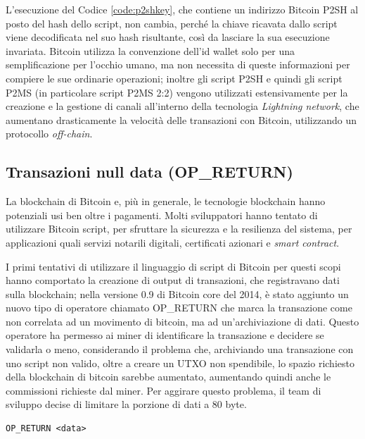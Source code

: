 

L’esecuzione del Codice \ref{code:p2shkey}, che contiene un indirizzo Bitcoin P2SH al posto del hash dello script, non cambia, perché la chiave ricavata dallo script viene decodificata nel suo hash risultante, così da lasciare la sua esecuzione invariata.
Bitcoin utilizza la convenzione dell'id wallet solo per una semplificazione per l'occhio umano, ma non necessita di queste informazioni per compiere le sue ordinarie operazioni; inoltre gli script P2SH e quindi gli script P2MS (in particolare script P2MS 2:2) vengono utilizzati estensivamente per la creazione e la gestione di canali all’interno della tecnologia {\it Lightning network\/}, che aumentano drasticamente la velocità delle transazioni con Bitcoin, utilizzando un protocollo {\it off-chain\/}.

\subsection{Transazioni null data (OP\_RETURN)}\label{sub:sectionNUllaDataScript}
La blockchain di Bitcoin e, più in generale, le tecnologie blockchain hanno potenziali usi ben oltre i pagamenti. Molti sviluppatori hanno tentato di utilizzare Bitcoin script, per sfruttare la sicurezza e la resilienza del sistema, per applicazioni quali servizi notarili digitali, certificati azionari e {\it smart contract\/}.

I primi tentativi di utilizzare il linguaggio di script di Bitcoin per questi scopi hanno comportato la creazione di output di transazioni, che registravano dati sulla blockchain; nella versione 0.9 di Bitcoin core del 2014, è stato aggiunto un nuovo tipo di operatore chiamato OP\_RETURN che marca la transazione come non correlata ad un movimento di bitcoin, ma ad un'archiviazione di dati. Questo operatore ha permesso ai miner di identificare la transazione e decidere se validarla o meno, considerando il problema che, archiviando una transazione con uno script non valido, oltre a creare un UTXO non spendibile, lo spazio richiesto della blockchain di bitcoin sarebbe aumentato, aumentando quindi anche le commissioni richieste dal miner.
Per aggirare questo problema, il team di sviluppo decise di limitare la porzione di dati a 80 byte.

\begin{lstlisting}[language=bitcoinscript, label={code:nulldata}, caption={Uso dell'operatore OP\_RETURN.}]
OP_RETURN <data>
\end{lstlisting}

